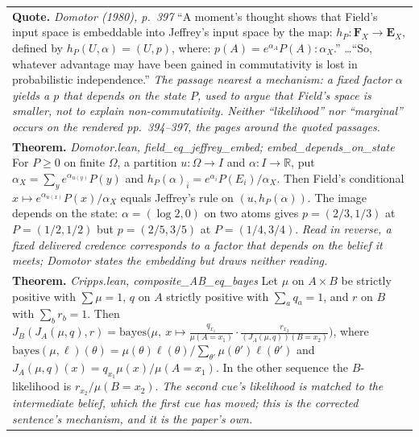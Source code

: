 \documentclass[10pt]{article}
\theoremstyle{definition}
\newlength{\fullw}\setlength{\fullw}{25.9cm}
\begin{document}
{\begin{longtable}{|p{0.9cm}|p{12.2cm}|p{12.2cm}|}
\multicolumn{3}{|p{\fullw}|}{\textbf{Quote.} \textit{Domotor (1980), p.~397} \newline ``A moment's thought shows that Field's input space is embeddable into Jeffrey's
input space by the map: $h_P : \mathbf{F}_X \to \mathbf{E}_X$, defined by
$h_P(U,\alpha) = (U,p)$, where: $p(A) = e^{\alpha_A} P(A) : \alpha_X$.'' \ldots ``So,
whatever advantage may have been gained in commutativity is lost in probabilistic
independence.'' \newline \textit{The passage nearest a mechanism: a fixed factor $\alpha$ yields a $p$ that depends on the state $P$, used to argue that Field's space is smaller, not to explain non-commutativity. Neither ``likelihood'' nor ``marginal'' occurs on the rendered pp.~394--397, the pages around the quoted passages.}} \\
\multicolumn{3}{|p{\fullw}|}{\textbf{Theorem.} \textit{Domotor.lean, field\_eq\_jeffrey\_embed; embed\_depends\_on\_state} \newline For $P\ge0$ on finite $\Omega$, a partition $u:\Omega\to I$ and $\alpha:I\to\mathbb{R}$,
put $\alpha_X=\sum_y e^{\alpha_{u(y)}}P(y)$ and $h_P(\alpha)_i=e^{\alpha_i}P(E_i)/\alpha_X$.
Then Field's conditional $x\mapsto e^{\alpha_{u(x)}}P(x)/\alpha_X$ equals Jeffrey's rule on
$(u,h_P(\alpha))$. The image depends on the state: $\alpha=(\log2,0)$ on two atoms gives
$p=(2/3,1/3)$ at $P=(1/2,1/2)$ but $p=(2/5,3/5)$ at $P=(1/4,3/4)$. \newline \textit{Read in reverse, a fixed delivered credence corresponds to a factor that depends on the belief it meets; Domotor states the embedding but draws neither reading.}} \\
\multicolumn{3}{|p{\fullw}|}{\textbf{Theorem.} \textit{Cripps.lean, composite\_AB\_eq\_bayes} \newline Let $\mu$ on $A\times B$ be strictly positive with $\sum\mu=1$, $q$ on $A$ strictly
positive with $\sum_a q_a=1$, and $r$ on $B$ with $\sum_b r_b=1$. Then
$J_B(J_A(\mu,q),r)=\mathrm{bayes}\big(\mu,\ x\mapsto
\tfrac{q_{x_1}}{\mu(A{=}x_1)}\cdot\tfrac{r_{x_2}}{(J_A(\mu,q))(B{=}x_2)}\big)$, where
$\mathrm{bayes}(\mu,\ell)(\theta)=\mu(\theta)\ell(\theta)/\sum_{\theta'}\mu(\theta')\ell(\theta')$
and $J_A(\mu,q)(x)=q_{x_1}\mu(x)/\mu(A{=}x_1)$. In the other sequence the $B$-likelihood is
$r_{x_2}/\mu(B{=}x_2)$. \newline \textit{The second cue's likelihood is matched to the intermediate belief, which the first cue has moved; this is the corrected sentence's mechanism, and it is the paper's own.}} \\

\end{longtable}}
\end{document}
